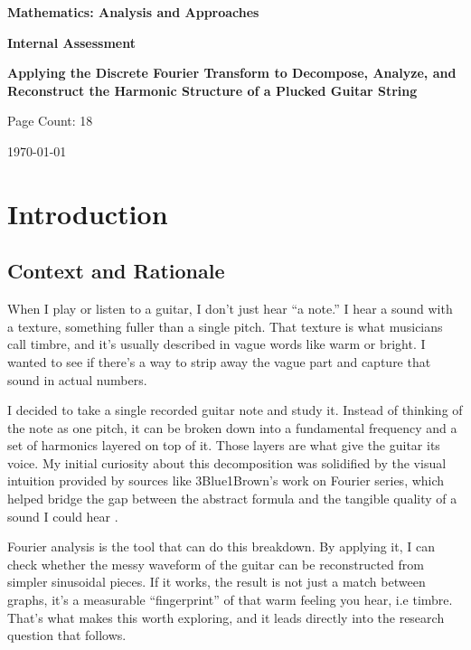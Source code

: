 \documentclass{article}
\author{Candidate Name} %
\begin{document}
\begin{titlepage}
    \centering
    \vspace*{2cm}
    
    \Large{\textbf{Mathematics: Analysis and Approaches}}
    \vspace{0.5cm}
    
    \Large{\textbf{Internal Assessment}}
    \vspace{3cm}
    
    \huge{\textbf{Applying the Discrete Fourier Transform to Decompose, Analyze, and Reconstruct the Harmonic Structure of a Plucked Guitar String}}
    \vspace{5cm}
    
    \Large{Page Count: 18       }
    
    \vfill
    
    \Large{\today}
\end{titlepage}

\newpage

\section{Introduction}

\subsection{Context and Rationale}
When I play or listen to a guitar, I don’t just hear “a note.” I hear a sound with a texture, something fuller than a single pitch. That texture is what musicians call timbre, and it’s usually described in vague words like warm or bright. I wanted to see if there’s a way to strip away the vague part and capture that sound in actual numbers.

I decided to take a single recorded guitar note and study it. Instead of thinking of the note as one pitch, it can be broken down into a fundamental frequency and a set of harmonics layered on top of it. Those layers are what give the guitar its voice. My initial curiosity about this decomposition was solidified by the visual intuition provided by sources like 3Blue1Brown's work on Fourier series, which helped bridge the gap between the abstract formula and the tangible quality of a sound I could hear \cite{3b1b}.

Fourier analysis is the tool that can do this breakdown. By applying it, I can check whether the messy waveform of the guitar can be reconstructed from simpler sinusoidal pieces. If it works, the result is not just a match between graphs, it’s a measurable “fingerprint” of that warm feeling you hear, i.e timbre. That’s what makes this worth exploring, and it leads directly into the research question that follows.
\end{document}
